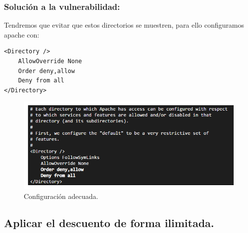 \documentclass[12pt,twoside]{article}
\begin{document}
\subsubsection*{Solución a  la vulnerabilidad:}
Tendremos que evitar que estos directorios se muestren, para ello configuramos apache con:
\begin{verbatim}
<Directory />
    AllowOverride None
    Order deny,allow
    Deny from all
</Directory>
\end{verbatim}
\begin{figure}[H]
    \centering
    \includegraphics[scale=0.5]{./imagenes/directorios_3}
    \caption{Configuración adecuada.}
\end{figure}
\subsection{Aplicar el descuento de forma ilimitada.}
\end{document}
